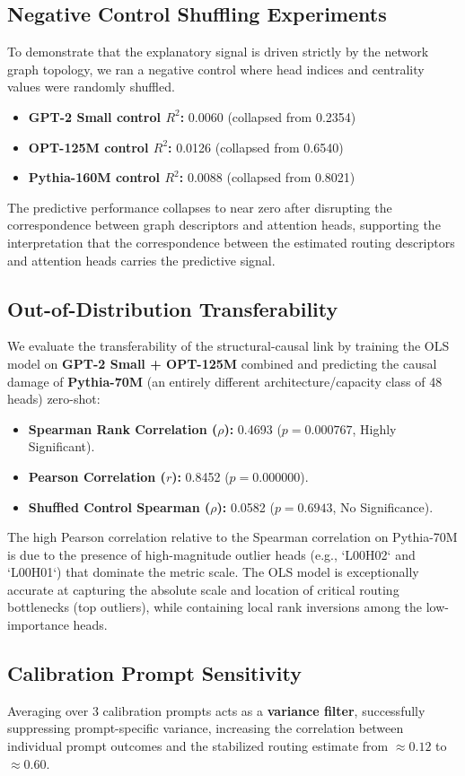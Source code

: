 \documentclass[11pt,a4paper]{article}
\theoremstyle{definition}
\theoremstyle{plain}
\begin{document}
\subsection{Negative Control Shuffling Experiments}
To demonstrate that the explanatory signal is driven strictly by the network graph topology, we ran a negative control where head indices and centrality values were randomly shuffled.
\begin{itemize}
    \item \textbf{GPT-2 Small control $R^2$:} 0.0060 (collapsed from 0.2354)
    \item \textbf{OPT-125M control $R^2$:} 0.0126 (collapsed from 0.6540)
    \item \textbf{Pythia-160M control $R^2$:} 0.0088 (collapsed from 0.8021)
\end{itemize}
The predictive performance collapses to near zero after disrupting the correspondence between graph descriptors and attention heads, supporting the interpretation that the correspondence between the estimated routing descriptors and attention heads carries the predictive signal.

\subsection{Out-of-Distribution Transferability}
We evaluate the transferability of the structural-causal link by training the OLS model on \textbf{GPT-2 Small + OPT-125M} combined and predicting the causal damage of \textbf{Pythia-70M} (an entirely different architecture/capacity class of 48 heads) zero-shot:
\begin{itemize}
    \item \textbf{Spearman Rank Correlation ($\rho$):} 0.4693 ($p = 0.000767$, Highly Significant).
    \item \textbf{Pearson Correlation ($r$):} 0.8452 ($p = 0.000000$).
    \item \textbf{Shuffled Control Spearman ($\rho$):} 0.0582 ($p = 0.6943$, No Significance).
\end{itemize}
The high Pearson correlation relative to the Spearman correlation on Pythia-70M is due to the presence of high-magnitude outlier heads (e.g., `L00H02` and `L00H01`) that dominate the metric scale. The OLS model is exceptionally accurate at capturing the absolute scale and location of critical routing bottlenecks (top outliers), while containing local rank inversions among the low-importance heads.

\subsection{Calibration Prompt Sensitivity}
Averaging over 3 calibration prompts acts as a \textbf{variance filter}, successfully suppressing prompt-specific variance, increasing the correlation between individual prompt outcomes and the stabilized routing estimate from $\approx 0.12$ to $\approx 0.60$.
\end{document}
